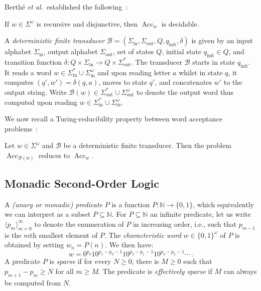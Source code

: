 \documentclass[a4paper,UKenglish,cleveref, autoref, thm-restate]{lipics-v2021}
\newcommand{\nat} {\mathbb{N}}
\newcommand{\Acc} {\operatorname{Acc}}
\begin{document}
Berth\'e \emph{et al.}\ established the following~\cite[Thm.~4.16]{berthe2024decidability}:
\begin{theorem}\label{thm : weakly normal decidable}
    If $w \in \Sigma^\omega$ is recursive and disjunctive, then $\Acc_w$ is decidable.
\end{theorem}

A \emph{deterministic finite transducer} $\mathcal{B} =
(\Sigma_{\text{in}}, \Sigma_{\text{out}}, Q, q_\text{init}, \delta)$ is
given by an input alphabet $\Sigma_\text{in}$, output alphabet
$\Sigma_\text{out}$, set of states $Q$, initial state $q_\text{init}
\in Q$, and transition function $\delta \colon Q \times \Sigma_\text{in}
\to Q \times \Sigma_\text{out}^*$.
The transducer $\mathcal{B}$ starts in state $q_\text{init}$.
It reads a word $w \in \Sigma_\text{in}^* \cup
\Sigma_\text{in}^\omega$ and upon reading letter $a$ whilst in state
$q$, it computes $(q', w') = \delta(q, a)$, moves to state $q'$, and
concatenates $w'$ to the output string.
Write $\mathcal{B}(w) \in \Sigma_\text{out}^* \cup
\Sigma_\text{out}^\omega$ to denote the output word thus computed upon
reading $w \in \Sigma_\text{in}^* \cup
\Sigma_\text{in}^\omega$.

We now recall a Turing-reducibility property between
word acceptance problems~\cite[Lem.~4.5]{berthe2024decidability}:
\begin{lemma}\label{thm : transducer reduction}
Let $w \in \Sigma^\omega$ and $\mathcal{B}$ be a deterministic finite transducer. Then the problem $\Acc_{\mathcal{B}(w)}$ reduces to $\Acc_{w}$.
\end{lemma} 

\subsection{Monadic Second-Order Logic}

A \emph{(unary or monadic) predicate} $P$ is a function
$P \colon \nat \to \{0, 1\}$, which equivalently we can interpret as a
subset $P \subseteq \nat$.  For $P \subseteq \nat$ an infinite
predicate, let us write $\langle p_m\rangle_{m=0}^\infty$ to denote
the enumeration of $P$ in increasing order, i.e., such that $p_{m-1}$ is the $m$th smallest element of $P$.
The \emph{characteristic word} $w \in \{0, 1\}^\omega$ of $P$ is
obtained by setting $w_n = P(n)$.  We then have:
\begin{equation}\label{eq : characteristic word P}
    w = 0^{p_0}10^{p_1 - p_0-1}10^{p_2 - p_1-1}10^{p_3 - p_2-1} \cdots \, .
\end{equation}
A predicate $P$ is \emph{sparse} if for every $N \ge 0$, there is $M \ge 0$ such that $p_{m+1} - p_m \ge N$ for all $m \ge M$.
The predicate is \emph{effectively sparse} if $M$ can always be
computed from $N$.
\end{document}
